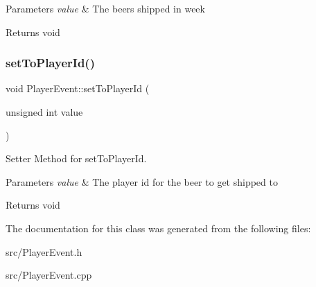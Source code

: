 \begin{DoxyParams}{Parameters}
{\em value} & The beers shipped in week \\
\hline
\end{DoxyParams}
\begin{DoxyReturn}{Returns}
void 
\end{DoxyReturn}
\mbox{\label{classPlayerEvent_ab867bb56d8a0cbf9c701a12f8c48987d}} 
\subsubsection{\texorpdfstring{set\+To\+Player\+Id()}{setToPlayerId()}}
{\footnotesize\ttfamily void Player\+Event\+::set\+To\+Player\+Id (\begin{DoxyParamCaption}\item[{unsigned int}]{value }\end{DoxyParamCaption})}



Setter Method for set\+To\+Player\+Id. 


\begin{DoxyParams}{Parameters}
{\em value} & The player id for the beer to get shipped to \\
\hline
\end{DoxyParams}
\begin{DoxyReturn}{Returns}
void 
\end{DoxyReturn}


The documentation for this class was generated from the following files\+:\begin{DoxyCompactItemize}
\item 
src/Player\+Event.\+h\item 
src/Player\+Event.\+cpp\end{DoxyCompactItemize}
